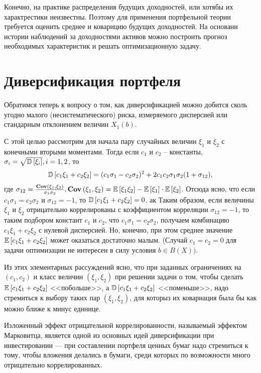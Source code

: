 Конечно, на практике распределения будущих доходностей, или хотябы их характрестики неизвестны.
Поэтому для применения портфельной теории требуется оценить среднее и коварицию будущих доходностей.
На основани истории наблюдений за доходностями активов можно построить прогноз необходимых характеристик
и решать оптимизационную задачу.

\section{Диверсификация портфеля}

Обратимся теперь к вопросу о том, как диверсификацией можно добится сколь угодно малого (несистематического) риска, измеряемого дисперсией
или стандарным отклонением величин $X_1(b)$.

С этой целью рассмотрим для начала пару случайных величин $\xi_1$ и $\xi_2$ с конечными вторыми моментами. Тогда если $c_1$ и $c_2$ -- константы,
$\sigma_i = \sqrt{\mathbb{D}\left[\xi_i\right]}, i=1,2$, то 
\begin{align}
\mathbb{D}\left[c_1 \xi_1 + c_2 \xi_2\right] = 
	(c_1 \sigma_1 - c_2 \sigma_2)^2 + 2 c_1 c_2 \sigma_1 \sigma_2 (1 + \sigma_{12}),
\end{align}
где $\sigma_{12} = \frac{\textbf{Cov}\left(\xi_1, \xi_2\right)}{\sigma_1 \sigma_2}, \textbf{Cov}\left(\xi_1, \xi_2\right) = \mathbb{E}\left[\xi_1 \xi_2\right] - \mathbb{E}\left[\xi_1\right] \cdot \mathbb{E}\left[\xi_2\right]$.
Отсюда ясно, что если $c_1 \sigma_1 = c_2 \sigma_2$ и $\sigma_{12} = -1$, то $\mathbb{D}\left[c_1 \xi_1 + c_2 \xi_2\right] = 0$.
ак
Таким образом, если величины $\xi_1$ и $\xi_2$ отрицательно коррелированы с коэффициентом корреляции $\sigma_{12} = -1$, то таким подбором
констант $c_1$ и $c_2$, что $c_1 \sigma_1 = c_2 \sigma_2$, получаем комбинацию $c_1 \xi_1 + c_2 \xi_2$ с нулевой дисперсией. Но,
конечно, при этом среднее значение $\mathbb{E}\left[c_1 \xi_1 + c_2 \xi_2\right]$ может оказаться достаточно малым. (Случай $c_1 = c_2 = 0$ для задачи 
оптимизации не интересен в силу условия $b \in B(X))$.

Из этих элементарных рассуждений ясно, что при заданных ограничениях на $(c_1, c_2)$ и класс величин $(\xi_1, \xi_2)$ при решении задачи о том,
чтобы сделать $\mathbb{E}\left[c_1 \xi_1 + c_2 \xi_2\right]$ <<побольше>>, а $\mathbb{D}\left[c_1 \xi_1 + c_2 \xi_2\right]$ <<поменьше>>, надо стремиться к выбору таких пар 
$(\xi_1, \xi_2)$, для которыз их ковариация была бы как можно ближе к минус единице.

Изложенный эффект отрицательной коррелированности, называемый эффектом Марковитца, является одной из основных идей диверсификации при инвестировании ---
при составлении портфеля ценных бумаг надо стремиться к тому, чтобы вложения делались в бумаги, среди которых по возможности много отрицательно коррелированных.

